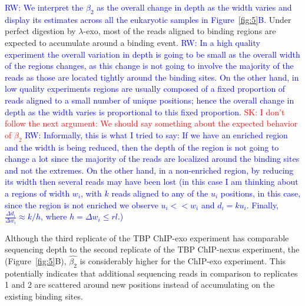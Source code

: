 \documentclass{bmcart}
\newcommand{\SK}[1]{\textcolor{red}{SK: #1}}
\newcommand{\RW}[1]{\textcolor{blue}{RW: #1}}
\begin{document}
\RW{We interpret the $\beta_2$ as the overall change in depth as the
  width varies and display its estimates across all the eukaryotic
  samples in Figure~\ref{fig:5}B.}
Under perfect digestion by $\lambda$-exo, most of the reads aligned to
binding regions are expected to accumulate around a binding
event. \RW{In a high quality experiment the overall variation in depth
  is going to be small as the overall width of the regions changes, as
  this change is not going to involve the majority of the reads as
  those are located tightly around the binding sites. On the other
  hand, in low quality experiments regions are usually composed of a
  fixed proportion of reads aligned to a small number of unique
  positions; hence the overall change in depth as the width varies is
  proportional to this fixed proportion.} \SK{I don't follow the next
  argument: We should say something about the expected behavior of
  $\beta_2$} \RW{Informally, this is what I tried to say: If we have
  an enriched region and the width is being reduced, then the depth of
  the region is not going to change a lot since the majority of the
  reads are localized around the binding sites and not the
  extremes. On the other hand, in a non-enriched region, by reducing
  its width then several reads may have been lost (in this case I am
  thinking about a regions of width $w_i$, with $k$ reads aligned to
  any of the $u_i$ positions, in this case, since the region is not
  enriched we observe $u_i << w_i$ and $d_i = k u_i$. Finally,
  $\frac{\Delta d_i}{\Delta w_i} \approx k /h $, where $h = \Delta w_i
  \leq rl$.)}

Although the third replicate of the TBP ChIP-exo experiment has
comparable sequencing depth to the second replicate of the TBP
ChIP-nexus experiment, the (Figure~\ref{fig:5}B), $\hat{\beta_2}$ is
considerably higher for the ChIP-exo experiment.  This potentially
indicates that additional sequencing reads in comparison to replicates
1 and 2 are scattered around new positions instead of accumulating on
the existing binding sites.
\end{document}
